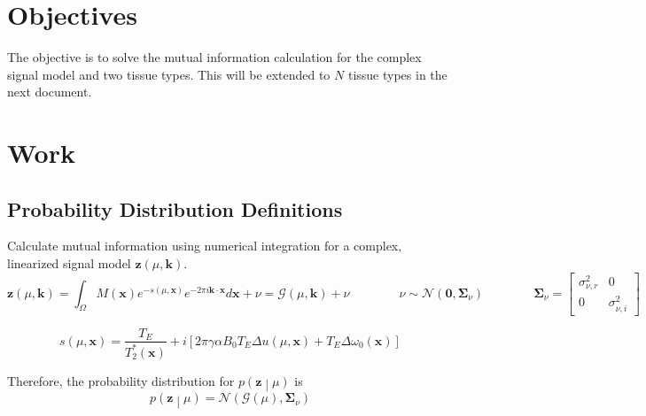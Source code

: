 \documentclass{article}         %
\theoremstyle{definition}
\theoremstyle{remark}
\newcommand{\eq}[1]{\begin{equation} #1 \end{equation}}
\newcommand{\zcond}{\mathbf{z}\middle|\mu}
\newcommand{\Gscript}{\mathcal{G}}
\newcommand{\Nscript}{\mathcal{N}}
\newcommand{\paren}[1]{\left(#1\right)}
\begin{document}

\section{Objectives}\label{Objectives}

The objective is to solve the mutual information calculation for the complex signal model and two tissue types. This will be extended to $N$ tissue types in the next document.

\section{Work}\label{Work}

\subsection{Probability Distribution Definitions}\label{Probability Distribution Definitions}

Calculate mutual information using numerical integration for a complex, linearized signal model $\mathbf{z}\left(\mu,\mathbf{k}\right)$.
\begin{equation}
	\mathbf{z}\left(\mu,\mathbf{k}\right) = \int_\Omega M\left(\mathbf{x}\right) e^{-s\left(\mu ,\mathbf{x}\right)}e^{-2\pi i\mathbf{k}\cdot\mathbf{x}}d\mathbf{x}+\nu=\mathcal{G}\left(\mu,\mathbf{k}\right)+\nu
	\qquad\qquad \nu\sim\mathcal{N}\left(\mathbf{0},\mathbf{\Sigma}_\nu\right)
	\qquad\qquad \mathbf{\Sigma}_\nu = \left[ \begin{array}{cc} 
		\sigma_{\nu,r}^2 & 0 \\
		0 & \sigma_{\nu,i}^2 \end{array} \right]
\end{equation}

\[
	s\left(\mu,\mathbf{x}\right)=\frac{T_E}{T_2^*\left(\mathbf{x}\right)}+i\left[2\pi\gamma\alpha B_0 T_E
	\Delta u\left(\mu,\mathbf{x}\right)+T_E\Delta\omega_0\left(\mathbf{x}\right)\right]
\]

Therefore, the probability distribution for $p\paren{\zcond}$ is
\eq{p\paren{\zcond} = \Nscript\paren{\Gscript\paren{\mu},\mathbf{\Sigma}_\nu}}
\end{document}
